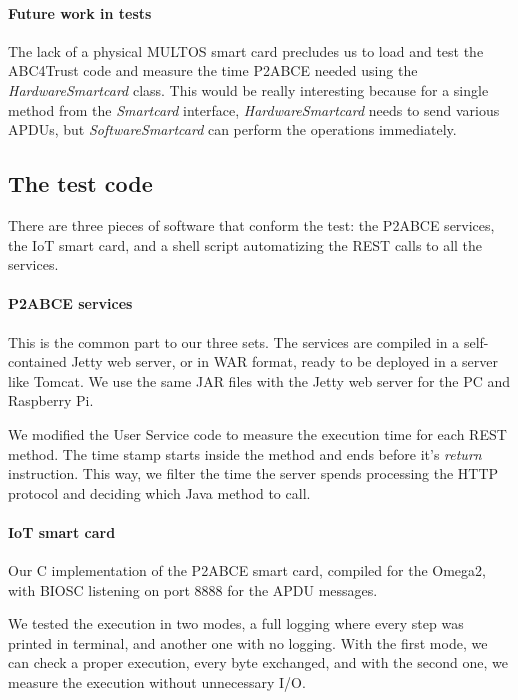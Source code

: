 \paragraph{Future work in tests} The lack of a physical MULTOS smart card precludes us to load and test the ABC4Trust code and measure the time P2ABCE needed using the \textit{HardwareSmartcard} class. This would be really interesting because for a single method from the \textit{Smartcard} interface, \textit{HardwareSmartcard} needs to send various APDUs, but \textit{SoftwareSmartcard} can perform the operations immediately.




\subsection{The test code}

There are three pieces of software that conform the test: the P2ABCE services, the IoT smart card, and a shell script automatizing the REST calls to all the services.

\paragraph{P2ABCE services} This is the common part to our three sets. The services are compiled in a self-contained Jetty web server, or in WAR format, ready to be deployed in a server like Tomcat. We use the same JAR files with the Jetty web server for the PC and Raspberry Pi.

We modified the User Service code to measure the execution time for each REST method. The time stamp starts inside the method and ends before it's \textit{return} instruction. This way, we filter the time the server spends processing the HTTP protocol and deciding which Java method to call.


\paragraph{IoT smart card} Our C implementation of the P2ABCE smart card, compiled for the Omega2, with BIOSC listening on port 8888 for the APDU messages.

We tested the execution in two modes, a full logging where every step was printed in terminal, and another one with no logging. With the first mode, we can check a proper execution, every byte exchanged, and with the second one, we measure the execution without unnecessary I/O.

